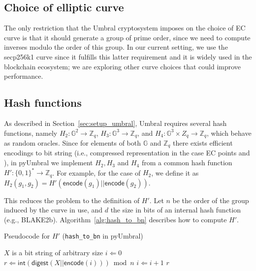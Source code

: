 \documentclass{amsart}
\newcommand{\pyumbral}{\textsf{pyUmbral}}
\begin{document}
\subsection{Choice of elliptic curve}
The only restriction that the Umbral cryptosystem imposes on the choice of EC curve is that it should generate a group of prime order, since we need to compute inverses modulo the order of this group. In our current setting, we use the \textsf{secp256k1} curve since it fulfills this latter requirement and it is widely used in the blockchain ecosystem; we are exploring other curve choices that could improve performance. 

\subsection{Hash functions}
As described in Section~\ref{sec:setup_umbral}, Umbral requires several hash functions, namely $H_2: \mathbb G^2 \to \mathbb Z_q$, $H_3: \mathbb G^3 \to \mathbb Z_q$, and $H_4: \mathbb G^3 \times Z_q \to \mathbb Z_q$, which behave as random oracles. Since for elements of both $\mathbb G$ and $\mathbb Z_q$ there exists efficient encodings to bit string (i.e., compressed representation in the case EC points and ), in \textsf{pyUmbral} we implement $H_2, H_3$ and $H_4$ from a common hash function $H': \{0,1\}^* \to \mathbb Z_q$. For example, for the case of $H_2$, we define it as $H_2(g_1, g_2) = H'(\mathsf{encode}(g_1)||\mathsf{encode}(g_2))$.

This reduces the problem to the definition of $H'$. Let $n$ be the order of the group induced by the curve in use, and $d$ the size in bits of an internal hash function (e.g., \textsf{BLAKE2b}). Algorithm~\ref{alg:hash_to_bn} describes how to compute $H'$. 


\begin{algorithm} %
\caption{Pseudocode for $H'$ (\texttt{hash\_to\_bn} in \pyumbral)} %
\label{alg:hash_to_bn} %
\begin{algorithmic} %
	\REQUIRE $X$ is a bit string of arbitrary size
    \STATE $i \Leftarrow 0$
	\REPEAT
		\STATE $r \Leftarrow \mathsf{int}(\mathsf{digest}(X||\mathsf{encode}(i))) \bmod n$
		\STATE $i \Leftarrow i + 1$
	\RETURN $r$
\end{algorithmic}
\end{algorithm}
\end{document}
